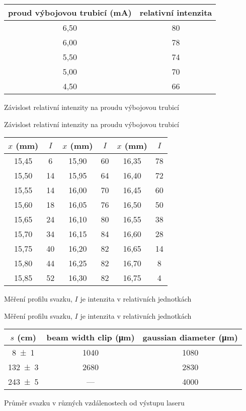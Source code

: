 \begin{tabulka}[htbp]
\centering
\begin{tabular}{c|c}
proud výbojovou trubicí (\si{\mA}) & relativní intenzita \\ \hline
6,50 & 80 \\
6,00 & 78 \\
5,50 & 74 \\
5,00 & 70 \\
4,50 & 66 \\
\end{tabular}
\caption{Závislost relativní intenzity na proudu výbojovou trubicí}
\label{t:proud}
\end{tabulka}


\begin{graph}[htbp]
\centering

\caption{Závislost relativní intenzity na proudu výbojovou trubicí}
\label{g:proud}
\end{graph}


\begin{tabulka}[htbp]
\centering
\begin{tabular}{cc||cc||cc}
$x$ (\si{\mm}) & $I$ & $x$ (\si{\mm}) & $I$ & $x$ (\si{\mm}) & $I$ \\ \hline
15,45 & 6 & 15,90 & 60 & 16,35 & 78 \\ 
15,50 & 14 & 15,95 & 64 & 16,40 & 72 \\ 
15,55 & 14 & 16,00 & 70 & 16,45 & 60 \\ 
15,60 & 18 & 16,05 & 76 & 16,50 & 50 \\ 
15,65 & 24 & 16,10 & 80 & 16,55 & 38 \\ 
15,70 & 34 & 16,15 & 84 & 16,60 & 28 \\ 
15,75 & 40 & 16,20 & 82 & 16,65 & 14 \\ 
15,80 & 44 & 16,25 & 82 & 16,70 & 8 \\ 
15,85 & 52 & 16,30 & 82 & 16,75 & 4 \\ 
\end{tabular}
\caption{Měření profilu svazku, $I$ je intenzita v relativních jednotkách}
\label{t:profil}
\end{tabulka}


\begin{graph}[htbp] 
\centering

\caption{Měření profilu svazku, $I$ je intenzita v relativních jednotkách}
\label{g:profil}
\end{graph}


\begin{tabulka}[htbp]
\centering
\begin{tabular}{c|c|c}
$s$ (\si{\cm}) & beam width clip (\si{\micro\metre}) & gaussian diameter (\si{\micro\metre}) \\
\hline
\num{8(1)} & 1040 & 1080 \\
\num{132(3)} & 2680 & 2830 \\
\num{243(5)} & --- & 4000 
\end{tabular}
\caption{Průměr svazku v různých vzdálenostech od výstupu laseru}
\label{t:div}
\end{tabulka}


